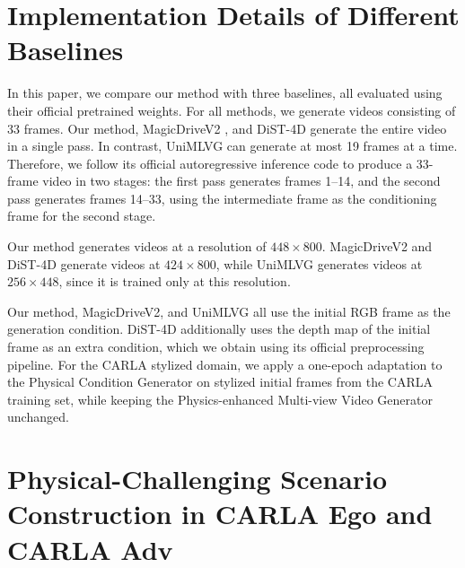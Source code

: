 \documentclass[runningheads]{llncs}
\begin{document}


\section{Implementation Details of Different Baselines}

In this paper, we compare our method with three baselines, all evaluated using their official pretrained weights. For all methods, we generate videos consisting of 33 frames. Our method, MagicDriveV2 \cite{gao2025magicdrive}, and DiST-4D \cite{guo2025dist} generate the entire video in a single pass. In contrast, UniMLVG \cite{chen2025unimlvg} can generate at most 19 frames at a time. Therefore, we follow its official autoregressive inference code to produce a 33-frame video in two stages: the first pass generates frames 1--14, and the second pass generates frames 14--33, using the intermediate frame as the conditioning frame for the second stage.

Our method generates videos at a resolution of $448 \times 800$. MagicDriveV2 and DiST-4D generate videos at $424 \times 800$, while UniMLVG generates videos at $256 \times 448$, since it is trained only at this resolution.

Our method, MagicDriveV2, and UniMLVG all use the initial RGB frame as the generation condition. DiST-4D additionally uses the depth map of the initial frame as an extra condition, which we obtain using its official preprocessing pipeline. For the CARLA stylized domain, we apply a one-epoch adaptation to the Physical Condition Generator on stylized initial frames from the CARLA training set, while keeping the  Physics-enhanced Multi-view Video Generator unchanged.


\section{Physical-Challenging Scenario Construction in CARLA Ego and CARLA Adv}
\end{document}
